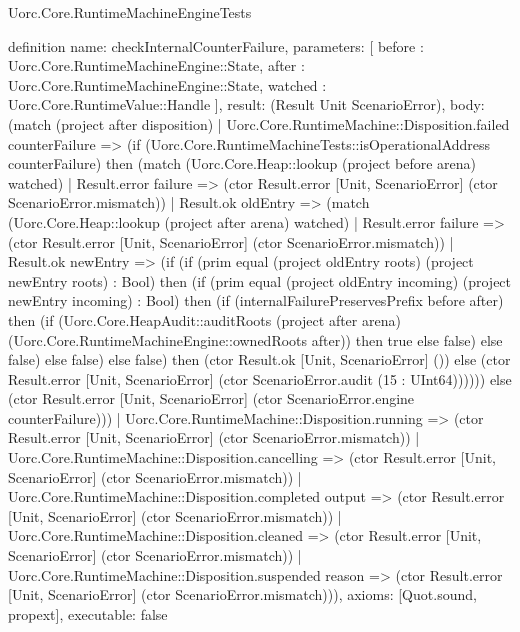\begin{lexlean}{Uorc.Core.RuntimeMachineEngineTests}
\begin{semanticmodule}
definition{
  name: checkInternalCounterFailure,
  parameters: [
    before : Uorc.Core.RuntimeMachineEngine::State,
    after : Uorc.Core.RuntimeMachineEngine::State,
    watched : Uorc.Core.RuntimeValue::Handle
  ],
  result: (Result Unit ScenarioError),
  body: (match (project after disposition)
    | Uorc.Core.RuntimeMachine::Disposition.failed counterFailure => (if (Uorc.Core.RuntimeMachineTests::isOperationalAddress counterFailure) then (match (Uorc.Core.Heap::lookup (project before arena) watched)
      | Result.error failure => (ctor Result.error [Unit, ScenarioError] (ctor ScenarioError.mismatch))
      | Result.ok oldEntry => (match (Uorc.Core.Heap::lookup (project after arena) watched)
        | Result.error failure => (ctor Result.error [Unit, ScenarioError] (ctor ScenarioError.mismatch))
        | Result.ok newEntry => (if (if (prim equal (project oldEntry roots) (project newEntry roots) : Bool) then (if (prim equal (project oldEntry incoming) (project newEntry incoming) : Bool) then (if (internalFailurePreservesPrefix before after) then (if (Uorc.Core.HeapAudit::auditRoots (project after arena) (Uorc.Core.RuntimeMachineEngine::ownedRoots after)) then true else false) else false) else false) else false) then (ctor Result.ok [Unit, ScenarioError] ()) else (ctor Result.error [Unit, ScenarioError] (ctor ScenarioError.audit (15 : UInt64)))))) else (ctor Result.error [Unit, ScenarioError] (ctor ScenarioError.engine counterFailure)))
    | Uorc.Core.RuntimeMachine::Disposition.running => (ctor Result.error [Unit, ScenarioError] (ctor ScenarioError.mismatch))
    | Uorc.Core.RuntimeMachine::Disposition.cancelling => (ctor Result.error [Unit, ScenarioError] (ctor ScenarioError.mismatch))
    | Uorc.Core.RuntimeMachine::Disposition.completed output => (ctor Result.error [Unit, ScenarioError] (ctor ScenarioError.mismatch))
    | Uorc.Core.RuntimeMachine::Disposition.cleaned => (ctor Result.error [Unit, ScenarioError] (ctor ScenarioError.mismatch))
    | Uorc.Core.RuntimeMachine::Disposition.suspended reason => (ctor Result.error [Unit, ScenarioError] (ctor ScenarioError.mismatch))),
  axioms: [Quot.sound, propext],
  executable: false
}


\end{semanticmodule}
\end{lexlean}
